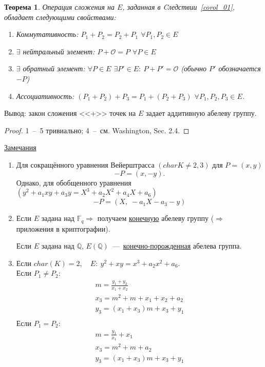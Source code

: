 \documentclass[12pt]{article}
\newcommand{\Q}{{{\mathbb Q}}}
\newcommand{\F}{{{\mathbb F}}}
\newtheorem{theorem}{Теорема}
\theoremstyle{definition}
\theoremstyle{definition}
\theoremstyle{definition}
\begin{document}
    \begin{theorem}
    	\label{theor_02}
    	Операция сложения на $E$, заданная в Cледствии~\ref{corol_01}, обладает следующими свойствами:
    	\begin{enumerate}
    		\item Коммутативность: ${P_1} + {P_2} = {P_2} + {P_1}$ $\forall {P_1},{P_2} \in E$
    		
    		\item $\exists $ нейтральный элемент: $P + \mathcal{O} = P$ $\forall P \in E$
    		
    		\item $\exists$ обратный элемент: $\forall P \in E$ $\exists P' \in E:\:P + P' = \mathcal{O}$ (обычно $P'$ обозначается $-P$)
    		
    		\item Ассоциативность: $\left( {{P_1} + {P_2}} \right) + {P_3} = {P_1} + \left( {{P_2} + {P_3}} \right)$ $\forall {P_1},{P_2},{P_3} \in E$.
    	\end{enumerate}
    \end{theorem}
    
    Вывод: закон сложения <<+>> точек на $E$ задает аддитивную абелеву группу.
    
    \begin{proof}
    1~--~5 тривиально; 4~--~см. Washington, Sec. 2.4.
    \end{proof}
    
    \underline{Замечания} 
    \begin{enumerate}
    \item Для сокращённого уравнения Вейерштрасса $\left(char K \ne 2,3 \right)$ для $P = \left( {x,y} \right)$ 
    \[
    - P = \left( {x, - y} \right).
    \] 
    Однако, для обобщенного уравнения $\left( {{y^2} + {a_1}xy + {a_3}y = {X^3} + {a_2}{X^2} + {a_4}X + {a_6}} \right)$ 
    \[ 
    - P = \left( {X,\; - {a_1}X - {a_3} - y} \right)
    \]
    
    \item Если $E$ задана над $\F_q \Rightarrow $ получаем \underline{конечную} абелеву группу ($ \Rightarrow $ приложения в криптографии).

    Если $E$ задана над $\Q$, $E\left( \Q \right)$~---~\underline{конечно-порожденная} абелева группа. 

    \item Если $char(K) = 2, \quad E:\:{y^2} + xy = {x^3} + {a_2}{x^2} + {a_6}$. \\
    Если ${P_1} \ne {P_2}$:
    \begin{gather*}
    m = \frac{y_1 + y_2}{x_1 + x_2} \\ 
    x_3 = m^2 + m + x_1 + x_2 + a_2 \\ 
    y_3 = ( x_1 + x_3)m + x_3 + y_1 \\
    \end{gather*}
    Если ${P_1} = {P_2}$:
    \begin{gather*}
    m = \frac{y_1}{x_1} + x_1 \\
    x_3 = m^2 + m + a_2 \\
    y_3 =( {x_1 + x_3})m + x_3 + y_1
    \end{gather*}
    \end{enumerate}
\end{document}
